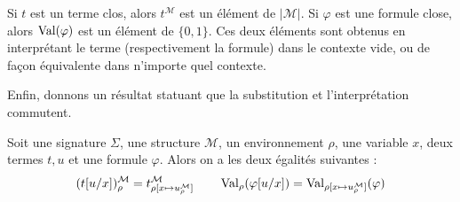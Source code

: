 \begin{definition}
  Si $t$ est un terme clos, alors $t^{\mathcal M}$ est un élément de
  $|\mathcal M|$. Si $\varphi$ est une formule close, alors $\operatorname{Val}(\varphi)$ est
  un élément de $\{0,1\}$. Ces deux éléments sont obtenus en interprétant le
  terme (respectivement la formule) dans le contexte vide, ou de façon
  équivalente dans n'importe quel contexte.
\end{definition}

Enfin, donnons un résultat statuant que la substitution et l'interprétation
commutent.

\begin{proposition}\label{prop.comm.subst.env}
  Soit une signature $\Sigma$, une structure $\mathcal M$, un environnement
  $\rho$, une variable $x$, deux termes $t,u$ et une formule $\varphi$. Alors on
  a les deux égalités suivantes :
  \[(t[u/x])_\rho^\mathcal M = t^\mathcal M_{\rho[x \mapsto u^\mathcal M_\rho]} \qquad
  \operatorname{Val}_\rho(\varphi[u/x]) = \operatorname{Val}_{\rho[x\mapsto u^\mathcal M_\rho]}(\varphi)\]
\end{proposition}

